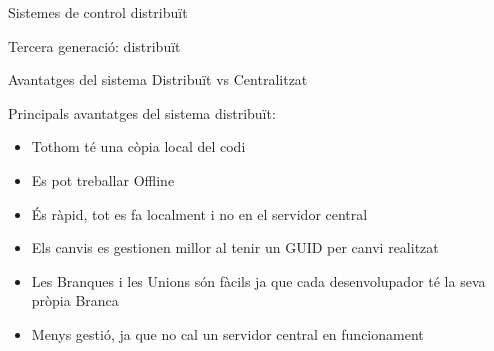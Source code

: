 \documentclass[10pt,xcolor={rgb}]{beamer}
\begin{document}
\begin{frame}[fragile]{Sistemes de control distribuït}
\begin{block}{Tercera generació: distribuït}
\begin{center}
        \end{center}

      \end{block}

    \end{frame}

    \begin{frame}[fragile]{Avantatges del sistema Distribuït vs Centralitzat}
      
            \begin{block}{Principals avantatges del sistema distribuït:}
      
              \begin{itemize}
                \item Tothom té una còpia local del codi
                \item Es pot treballar Offline
                \item És ràpid, tot es fa localment i no en el servidor central
                \item Els canvis es gestionen millor al tenir un GUID per canvi realitzat
                \item Les Branques i les Unions són fàcils ja que cada desenvolupador té la seva pròpia Branca
                \item Menys gestió, ja que no cal un servidor central en funcionament
              \end{itemize}
      
            \end{block}
      
    \end{frame}
\end{document}
